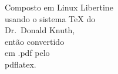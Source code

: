 \vspace*{\fill}
	\begin{flushright}
	{\large 
	Composto em Linux Libertine \\
	usando o sistema \TeX{} do \\
	Dr.~Donald Knuth, \\
	então convertido \\
	em .pdf pelo \\
	pdflatex. \\}
	\end{flushright}
